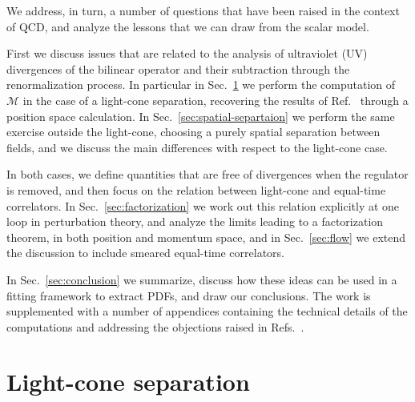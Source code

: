 We address, in turn, a number of questions that have been raised in the context of
QCD, and analyze the lessons that we can draw from the scalar model. 

First we discuss issues that are related to the analysis of ultraviolet (UV)
divergences of the bilinear operator and their subtraction through the
renormalization process. In particular in Sec.~\ref{sec:light-cone} we perform
the computation of $\mathcal{M}$ in the case of a light-cone separation,
recovering the results of Ref.~\cite{Collins:1980ui} through a position space
calculation. In Sec.~\ref{sec:spatial-separtaion} we perform the same exercise
outside the light-cone, choosing a purely spatial separation between fields, and
we discuss the main differences with respect to the light-cone case. 

In both cases, we define quantities that are free of divergences when the
regulator is removed, and then focus on the relation between light-cone and
equal-time correlators. In Sec.~\ref{sec:factorization} we work out this
relation explicitly at one loop in perturbation theory, and analyze the limits
leading to a factorization theorem, in both position and momentum space, and
in Sec.~\ref{sec:flow} we extend the discussion to include smeared equal-time correlators.  

In Sec.~\ref{sec:conclusion} we summarize, discuss how these ideas can be used
in a fitting framework to extract PDFs, and draw our conclusions. The work is
supplemented with a number of appendices containing the technical details of the
computations and addressing the objections raised in
Refs.~\cite{Rossi:2017muf,Rossi:2018zkn}.


\section{Light-cone separation}
\label{sec:light-cone}

